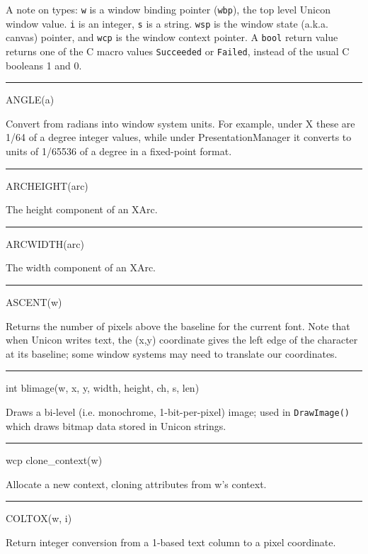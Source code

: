 A note on types: \texttt{w} is a window binding pointer
(\texttt{wbp}), the top level Unicon
{\textquotedbl}window{\textquotedbl} value. \texttt{i} is an integer,
\texttt{s} is a string. \texttt{wsp} is the window state
(a.k.a. canvas) pointer, and \texttt{wcp} is the window context
pointer. A \texttt{bool} return value returns one of the C macro
values \texttt{Succeeded} or \texttt{Failed}, instead of the usual C
booleans 1 and 0.


\bigskip\hrule\vspace{0.1cm}
\noindent
ANGLE(a)


Convert from radians into window system units. For example, under X
these are 1/64 of a degree integer values, while under
PresentationManager it converts to units of 1/65536 of a degree in a
fixed-point format.

{\sffamily\bfseries
\bigskip\hrule\vspace{0.1cm}
\noindent
ARCHEIGHT(arc)}


The height component of an XArc.

{\sffamily\bfseries
\bigskip\hrule\vspace{0.1cm}
\noindent
ARCWIDTH(arc)}


The width component of an XArc.

{\sffamily\bfseries
\bigskip\hrule\vspace{0.1cm}
\noindent
ASCENT(w)}


Returns the number of pixels above the baseline for the current
font. Note that when Unicon writes text, the (x,y) coordinate gives
the left edge of the character at its baseline; some window systems
may need to translate our coordinates.

{\sffamily\bfseries
\bigskip\hrule\vspace{0.1cm}
\noindent
int blimage(w, x, y, width, height, ch, s, len)}

Draws a bi-level (i.e. monochrome, 1-bit-per-pixel) image; used in
\texttt{DrawImage()} which draws bitmap data stored in Unicon strings.

{\sffamily\bfseries
\bigskip\hrule\vspace{0.1cm}
\noindent
wcp clone\_context(w)}


Allocate a new context, cloning attributes from w's context.

{\sffamily\bfseries
\bigskip\hrule\vspace{0.1cm}
\noindent
COLTOX(w, i)}


Return integer conversion from a 1-based text column to a pixel coordinate.

